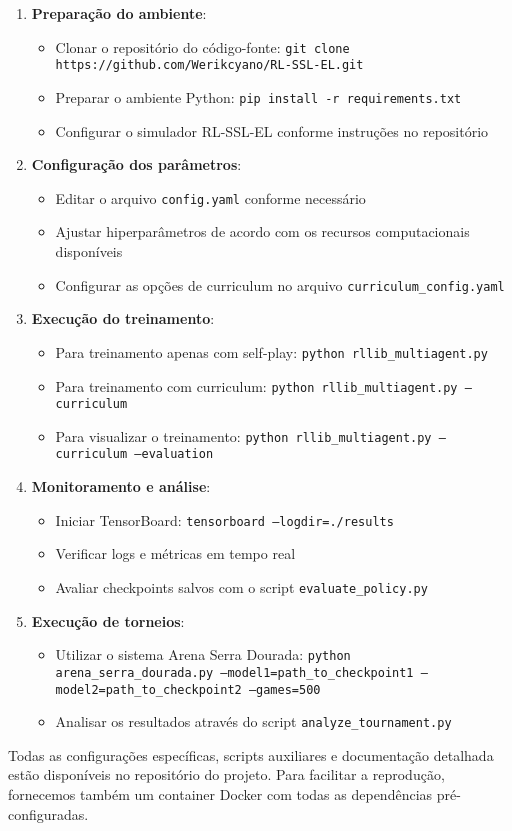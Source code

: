 \begin{enumerate}
    \item \textbf{Preparação do ambiente}:
    \begin{itemize}
        \item Clonar o repositório do código-fonte: \texttt{git clone https://github.com/Werikcyano/RL-SSL-EL.git}
        \item Preparar o ambiente Python: \texttt{pip install -r requirements.txt}
        \item Configurar o simulador RL-SSL-EL conforme instruções no repositório
    \end{itemize}
    
    \item \textbf{Configuração dos parâmetros}:
    \begin{itemize}
        \item Editar o arquivo \texttt{config.yaml} conforme necessário
        \item Ajustar hiperparâmetros de acordo com os recursos computacionais disponíveis
        \item Configurar as opções de curriculum no arquivo \texttt{curriculum\_config.yaml}
    \end{itemize}
    
    \item \textbf{Execução do treinamento}:
    \begin{itemize}
        \item Para treinamento apenas com self-play: \texttt{python rllib\_multiagent.py}
        \item Para treinamento com curriculum: \texttt{python rllib\_multiagent.py --curriculum}
        \item Para visualizar o treinamento: \texttt{python rllib\_multiagent.py --curriculum --evaluation}
    \end{itemize}
    
    \item \textbf{Monitoramento e análise}:
    \begin{itemize}
        \item Iniciar TensorBoard: \texttt{tensorboard --logdir=./results}
        \item Verificar logs e métricas em tempo real
        \item Avaliar checkpoints salvos com o script \texttt{evaluate\_policy.py}
    \end{itemize}
    
    \item \textbf{Execução de torneios}:
    \begin{itemize}
        \item Utilizar o sistema Arena Serra Dourada: \texttt{python arena\_serra\_dourada.py --model1=path\_to\_checkpoint1 --model2=path\_to\_checkpoint2 --games=500}
        \item Analisar os resultados através do script \texttt{analyze\_tournament.py}
    \end{itemize}
\end{enumerate}

Todas as configurações específicas, scripts auxiliares e documentação detalhada estão disponíveis no repositório do projeto. Para facilitar a reprodução, fornecemos também um container Docker com todas as dependências pré-configuradas.
